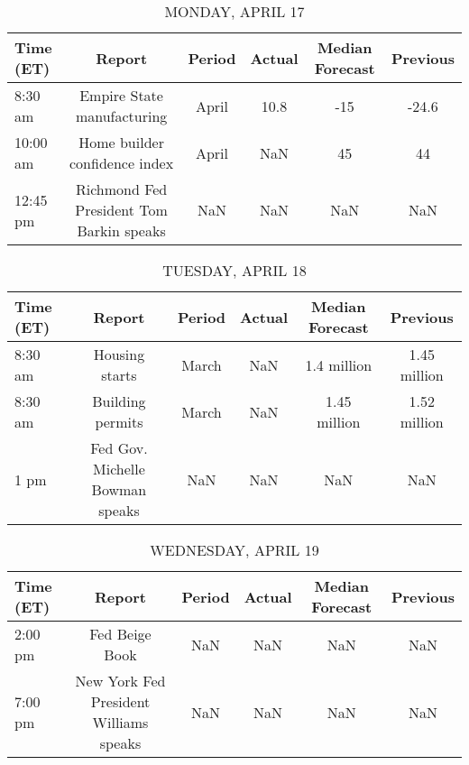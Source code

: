 \documentclass{article}%
\begin{document}
%
\normalsize%


\begin{table}[htbp]%
\caption{MONDAY, APRIL 17}%
\centering%
\begin{adjustbox}{width=1\textwidth}%
\begin{tabular}{lccccc}
\toprule
Time (ET) &                                   Report & Period & Actual & Median Forecast & Previous \\
\midrule
  8:30 am &               Empire State manufacturing &  April &   10.8 &             -15 &    -24.6 \\
 10:00 am &            Home builder confidence index &  April &    NaN &              45 &       44 \\
 12:45 pm & Richmond Fed President Tom Barkin speaks &    NaN &    NaN &             NaN &      NaN \\
\bottomrule
\end{tabular}
%
\end{adjustbox}%
\end{table}

%


\begin{table}[htbp]%
\caption{TUESDAY, APRIL 18}%
\centering%
\begin{adjustbox}{width=1\textwidth}%
\begin{tabular}{lccccc}
\toprule
Time (ET) &                          Report & Period & Actual & Median Forecast &     Previous \\
\midrule
  8:30 am &                  Housing starts &  March &    NaN &     1.4 million & 1.45 million \\
  8:30 am &                Building permits &  March &    NaN &    1.45 million & 1.52 million \\
     1 pm & Fed Gov. Michelle Bowman speaks &    NaN &    NaN &             NaN &          NaN \\
\bottomrule
\end{tabular}
%
\end{adjustbox}%
\end{table}

%


\begin{table}[htbp]%
\caption{WEDNESDAY, APRIL 19}%
\centering%
\begin{adjustbox}{width=1\textwidth}%
\begin{tabular}{lccccc}
\toprule
Time (ET) &                                 Report & Period & Actual & Median Forecast & Previous \\
\midrule
  2:00 pm &                         Fed Beige Book &    NaN &    NaN &             NaN &      NaN \\
  7:00 pm & New York Fed President Williams speaks &    NaN &    NaN &             NaN &      NaN \\
\bottomrule
\end{tabular}
%
\end{adjustbox}%
\end{table}
\end{document}
